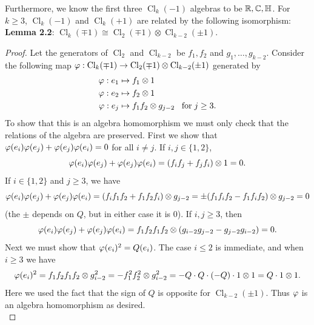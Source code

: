 \documentclass{amsart}
\DeclareMathOperator{\Cl}{\mathrm{Cl}}
\begin{document}
	Furthermore, we know the first three $\Cl_k(-1)$ algebras to be $\mathbb{R},\mathbb{C},\mathbb{H}$. For $k\geq 3$, $\Cl_k(-1)$ and $\Cl_k(+1)$ are related by the following isomorphism:\\
	
	\noindent \textbf{Lemma 2.2}: $\Cl_k(\mp 1)\cong \Cl_2(\mp 1) \otimes \Cl_{k-2}(\pm 1)$.
	\begin{proof}
		Let the generators of $\Cl_2$ and $\Cl_{k-2}$ be $f_1,f_2$ and $g_1,\dots,g_{k-2}$. Consider the following map $\ph:\Cl_k(\mp 1)\to \Cl_2(\mp 1)\otimes \Cl_{k-2}(\pm 1)$ generated by
		\begin{align*}
			\varphi: e_1 \mapsto& \; f_1\otimes 1\\
			\varphi: e_2 \mapsto& \; f_2\otimes 1\\
			\varphi: e_j \mapsto& \; f_1f_2\otimes g_{j-2} \;\;\; \text{for} \; j\geq 3.
		\end{align*}
		To show that this is an algebra homomorphism we must only check that the relations of the algebra are preserved. First we show that $\varphi(e_i)\varphi(e_j)+\varphi(e_j)\varphi(e_i)=0$ for all $i\neq j$. If $i,j\in \{1,2\}$,
		$$
		\varphi(e_i)\varphi(e_j)+\varphi(e_j)\varphi(e_i) = (f_if_j+f_jf_i)\otimes 1 = 0.
		$$
		If $i\in \{1,2\}$ and $j\geq 3$, we have
		$$
		\varphi(e_i)\varphi(e_j)+\varphi(e_j)\varphi(e_i)= (f_if_1f_2 + f_1f_2f_i)\otimes g_{j-2} = \pm (f_1f_if_2 - f_1f_if_2)\otimes g_{j-2} = 0
		$$
		(the $\pm$ depends on $Q$, but in either case it is 0). If $i,j\geq 3$, then
		$$
		\varphi(e_i)\varphi(e_j)+\varphi(e_j)\varphi(e_i) = f_1f_2f_1f_2\otimes (g_{i-2}g_{j-2}- g_{j-2}g_{i-2}) = 0.
		$$
		Next we must show that $\varphi(e_i)^2=Q(e_i)$. The case $i\leq 2$ is immediate, and when $i\geq 3$ we have
		$$
		\varphi(e_i)^2 = f_1f_2f_1f_2\otimes g_{i-2}^2 = -f_1^2f_2^2\otimes g_{i-2}^2 = -Q\cdot Q\cdot (-Q)\cdot 1\otimes 1 = Q\cdot 1\otimes 1.
		$$
		Here we used the fact that the sign of $Q$ is opposite for $\Cl_{k-2}(\pm 1)$. Thus $\varphi$ is an algebra homomorphism as desired.\\
		

\end{proof}
\end{document}
